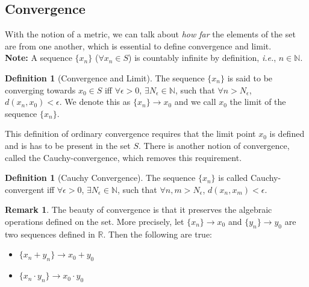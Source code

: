 \documentclass{report}
\theoremstyle{plain}
\theoremstyle{definition}
\newtheorem{definition}[theorem]{Definition} %
\newtheorem{remark}[theorem]{Remark} %
\begin{document}
\subsection{Convergence}
\noindent With the notion of a metric, we can talk about \emph{how far} the elements of the set are from one another, which is essential to define convergence and limit.\\
\noindent\textbf{Note:} A sequence $\{x_n\}$ ($\forall x_n\in S$) is countably infinite by definition, \emph{i.e.}, $n\in\mathbb{N}$.
\begin{definition}[Convergence and Limit]
The sequence $\{x_n\}$ is said to be converging towards $x_0\in S$ iff $\forall\epsilon>0$, $\exists N_\epsilon\in\mathbb{N}$, such that $\forall n >N_\epsilon$, $d(x_n, x_0) < \epsilon$. We denote this as $\{x_n\}\rightarrow x_0$ and we call $x_0$ the limit of the sequence $\{x_n\}$.
\end{definition}
\noindent This definition of ordinary convergence requires that the limit point $x_0$ is defined and is has to be present in the set $S$. There is another notion of convergence, called the Cauchy-convergence, which removes this requirement.
\begin{definition}[Cauchy Convergence]
The sequence $\{x_n\}$ is called Cauchy-convergent iff $\forall\epsilon>0$, $\exists N_\epsilon\in\mathbb{N}$, such that $\forall n,m >N_\epsilon$, $d(x_n, x_m) < \epsilon$.
\end{definition}
\begin{remark}
The beauty of convergence is that it preserves the algebraic operations defined on the set. More precisely, let $\{x_n\}\rightarrow x_0$ and $\{y_n\}\rightarrow y_0$ are two sequences defined in $\mathbb{R}$. Then the following are true:
\begin{itemize}
\item[(a)] $\{x_n+y_n\}\rightarrow x_0+y_0$
\item[(b)] $\{x_n\cdot y_n\}\rightarrow x_0\cdot y_0$
\end{itemize}
\end{remark}
\end{document}
